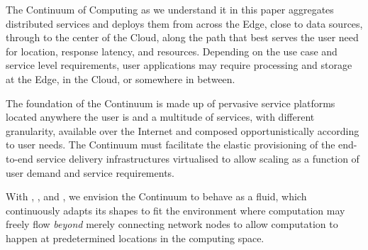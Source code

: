 The Continuum of Computing as we understand it in this paper aggregates distributed services and deploys them from across the Edge, close to data sources, through to the center of the Cloud, along the path that best serves the user need for location, response latency, and resources.
Depending on the use case and service level requirements, user applications may require processing and storage at the Edge, in the Cloud, or somewhere in between. %

The foundation of the Continuum is made up of pervasive service platforms located anywhere the user is and a multitude of services, with different granularity, available over the Internet and composed opportunistically according to user needs.
The Continuum must facilitate the elastic provisioning of the end-to-end service delivery infrastructures virtualised to allow scaling as a function of user demand and service requirements. 

With \cite{latre2014fluid}, \cite{abdelbaky2017computing}, and \cite{beckman2020harnessing}, we envision the Continuum to behave as a fluid, which continuously adapts its shapes to fit the environment where computation may freely flow \textit{beyond} merely connecting network nodes to allow computation to happen at predetermined locations in the computing space.

